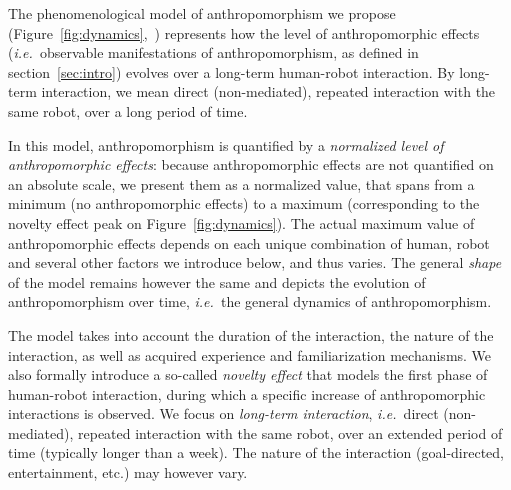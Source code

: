 \documentclass{frontiersSCNS} %
\newcommand{\ie}{{\textit{i.e.~}}}
\begin{document}
The phenomenological model of anthropomorphism we propose
(Figure~\ref{fig:dynamics},~\cite{lemaignan2014dynamics}) represents how the
level of anthropomorphic effects (\ie observable manifestations of
anthropomorphism, as defined in section~\ref{sec:intro}) evolves over a
long-term human-robot interaction. By long-term interaction, we mean direct
(non-mediated), repeated interaction with the same robot, over a long period of
time. 

In this model, anthropomorphism is quantified by a \emph{normalized level of
anthropomorphic effects}: because anthropomorphic effects are not quantified on
an absolute scale, we present them as a normalized value, that spans from a
minimum (no anthropomorphic effects) to a maximum (corresponding to the novelty
effect peak on Figure~\ref{fig:dynamics}). The actual maximum value of
anthropomorphic effects depends on each unique combination of human, robot and
several other factors we introduce below, and thus varies. The general
\emph{shape} of the model remains however the same and depicts the evolution of
anthropomorphism over time, \ie the general dynamics of anthropomorphism.

The model takes into account the duration of the interaction, the nature of the
interaction, as well as acquired experience and familiarization mechanisms. We
also formally introduce a so-called \emph{novelty effect} that models the first
phase of human-robot interaction, during which a specific increase of
anthropomorphic interactions is observed. We focus on \emph{long-term
interaction}, \ie direct (non-mediated), repeated interaction with the same
robot, over an extended period of time (typically longer than a week). The nature 
of the interaction (goal-directed, entertainment, etc.) may
however vary.
\end{document}
